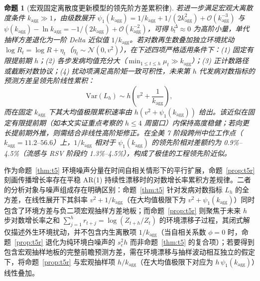 \documentclass[11pt,a4paper]{article}
\theoremstyle{plain}
\newtheorem{proposition}{命题}
\theoremstyle{definition}
\begin{document}
\begin{proposition}[宏观固定离散度更新模型的领先阶方差累积律]
若进一步满足宏观大离散度条件 $k_{\text{agg}} \gg 1$，由级数展开 $\psi_1(k_{\text{agg}}) = 1/k_{\text{agg}} + 1/(2k_{\text{agg}}^2) + \mathcal{O}(k_{\text{agg}}^{-3})$ 与 $\psi(k_{\text{agg}}) - \ln k_{\text{agg}} = -1/(2k_{\text{agg}}) + \mathcal{O}(k_{\text{agg}}^{-2})$，可得 $b_t^\Delta \approx 0$ 为高阶小量，单代抽样方差退化为一阶 Delta 近似值 $1/k_{\text{agg}}$。若对数再生数叠加独立环境扰动 $\log R_t = \log R + \eta_t$（$\eta_t \sim \mathcal{N}(0, v^2)$），在下述四项严格适用条件下：(1) 固定有限提前期 $h$；(2) 各步发病均值充分大（$\min_{1 \le t \le h} \mu_t \gg k_{\text{agg}}$）；(3) 正计数路径或截断对数协议；(4) 扰动项满足高阶矩一致可积性，未来第 $h$ 代发病对数指标的预测方差呈领先阶线性累积：
\begin{equation}
\text{Var}(L_h) \sim h \left(v^2 + \frac{1}{k_{\text{agg}}}\right),
\end{equation}
而在固定 $k_{\text{agg}}$ 下其大均值极限累积速率由 $h(v^2 + \psi_1(k_{\text{agg}}))$ 给出。该近似在固定有限提前期（如本文实证重点考察的 $h \le 4$ 周窗口）内保持高度稳健；若向更长提前期外推，则需结合非线性高阶矩修正。在全美 7 阶段跨州中位工作点（$k_{\text{agg}} = 11.2\text{--}56.6$）上，$1/k_{\text{agg}}$ 相对于 $\psi_1(k_{\text{agg}})$ 的领先阶相对差额约为 0.9\%--4.5\%（流感与 RSV 阶段约 1.3\%--4.5\%），构成了极佳的工程领先阶近似。
\end{proposition}


作为命题~\ref{thm:t5} 环境噪声分量在时间自相关情形下的平行扩展，命题~\ref{prop:t5r} 刻画传播增长率存在平稳 AR(1) 持续性漂移时的对数增长率累积方差规律。二者的分析对象与噪声组成存在明确区别：命题~\ref{thm:t5} 针对发病对数指标 $L_h$ 的全方差，在线性展开下其斜率 $v^2 + 1/k_{\text{agg}}$（在大均值极限下为 $v^2 + \psi_1(k_{\text{agg}})$）同时包含了环境方差与负二项宏观抽样方差地板；而命题~\ref{prop:t5r} 则聚焦于未来 $h$ 步对数增长率之和 $\sum_{j=1}^h r_{t+j} = \log(Z_{t+h}/Z_t)$ 的环境漂移子过程，其闭式解仅描述外生环境扰动，并不包含内生离散项 $1/k_{\text{agg}}$（当自相关系数 $\phi=0$ 时，命题~\ref{prop:t5r} 退化为纯环境白噪声的 $s_e^2 h$ 而非命题~\ref{thm:t5} 的复合项）；若要得到包含宏观抽样地板的完整前瞻预测方差，需在环境漂移与抽样波动相互独立的假定下，将命题~\ref{prop:t5r} 与宏观抽样项 $h/k_{\text{agg}}$（在大均值极限下对应为 $h\,\psi_1(k_{\text{agg}})$）线性叠加。
\end{document}
